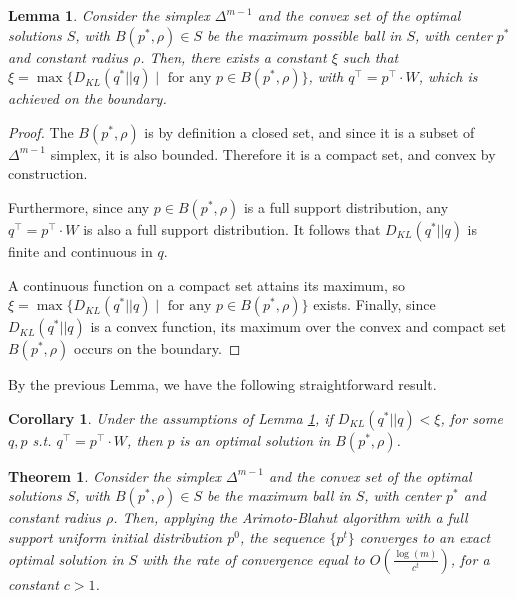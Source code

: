 \documentclass[11pt, letterpaper]{article}
\newtheorem{theorem}{Theorem}
\newtheorem{lemma}{Lemma}
\newtheorem{corollary}{Corollary}
\begin{document}
\begin{lemma}
\label{lemma:boundary}
Consider the simplex $\Delta^{m-1}$ and the convex set of the optimal solutions $S$, with $B(p^*, \rho) \in S$ be the maximum possible ball in $S$, with center $p^*$ and constant radius $\rho$. Then, there exists a constant $\xi$ such that $\xi = \max \{D_{KL}(q^*|| q) \mid \text{ for any }p \in B(p^*, \rho)\}$, with $q^{\top} = p^{\top}\cdot W$, which is achieved on the boundary.  
\end{lemma}
\begin{proof}
The $B(p^*,\rho)$ is by definition a closed set, and since it is a subset of $\Delta^{m-1}$ simplex, it is also bounded. Therefore it is a compact set, and convex by construction.

Furthermore, since any $p \in B(p^*,\rho)$ is a full support distribution, any $q^{\top} = p^{\top}\cdot W$ is also a full support distribution. It follows that $D_{KL}(q^*|| q)$ is finite and continuous in $q$. 

A continuous function on a compact set attains its maximum, so $\xi = \max \{D_{KL}(q^*|| q) \mid \text{ for any }p \in B(p^*, \rho)\}$ exists. Finally, since $D_{KL}(q^*|| q)$ is a convex function, its maximum over the convex and compact set $B(p^*,\rho)$ occurs on the boundary. 
\end{proof}

\noindent By the previous Lemma, we have the following straightforward result.

\begin{corollary}
\label{corollary 1}
Under the assumptions of Lemma \ref{lemma:boundary}, if $D_{KL}(q^*|| q)<\xi$, for some $q,p$ s.t. $q^{\top} = p^{\top} \cdot W$, then $p$ is an optimal solution in $B(p^*,\rho)$.
\end{corollary}

\begin{theorem}\label{thm: converge to exact solution in the interior}
Consider the simplex $\Delta^{m-1}$ and the convex set of the optimal solutions $S$, with $B(p^*, \rho) \in S$ be the maximum ball in $S$, with center $p^*$ and constant radius $\rho$. Then, applying the Arimoto-Blahut algorithm with a full support uniform initial distribution $p^0$, the sequence $\{p^t\}$ converges to an exact optimal solution in $S$ with the rate of convergence equal to $O\left(\frac{\log(m)}{c^t} \right)$, for a constant $c > 1$. 
\end{theorem}
\end{document}

